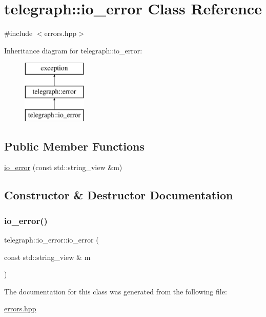 \hypertarget{classtelegraph_1_1io__error}{}\section{telegraph\+:\+:io\+\_\+error Class Reference}
\label{classtelegraph_1_1io__error}


{\ttfamily \#include $<$errors.\+hpp$>$}

Inheritance diagram for telegraph\+:\+:io\+\_\+error\+:\begin{figure}[H]
\begin{center}
\leavevmode
\includegraphics[height=3.000000cm]{classtelegraph_1_1io__error}
\end{center}
\end{figure}
\subsection*{Public Member Functions}
\begin{DoxyCompactItemize}
\item 
\hyperlink{classtelegraph_1_1io__error_a173bdfb9ed5c5ec6dd4d80a137834d41}{io\+\_\+error} (const std\+::string\+\_\+view \&m)
\end{DoxyCompactItemize}


\subsection{Constructor \& Destructor Documentation}
\mbox{\label{classtelegraph_1_1io__error_a173bdfb9ed5c5ec6dd4d80a137834d41}} 
\subsubsection{\texorpdfstring{io\+\_\+error()}{io\_error()}}
{\footnotesize\ttfamily telegraph\+::io\+\_\+error\+::io\+\_\+error (\begin{DoxyParamCaption}\item[{const std\+::string\+\_\+view \&}]{m }\end{DoxyParamCaption})\hspace{0.3cm}{\ttfamily [inline]}}



The documentation for this class was generated from the following file\+:\begin{DoxyCompactItemize}
\item 
\hyperlink{errors_8hpp}{errors.\+hpp}\end{DoxyCompactItemize}
